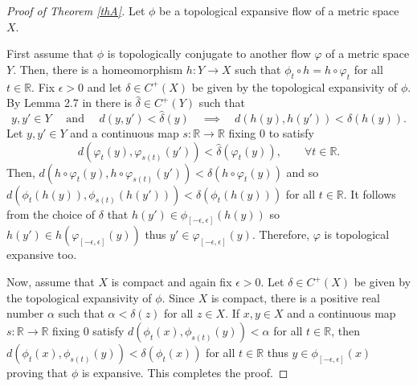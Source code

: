 \documentclass[11pt,letterpaper]{amsart}
\begin{document}
\begin{proof}[Proof of Theorem \ref{thA}]
Let $\phi$ be a topological expansive flow of a metric space $X$.

First assume that $\phi$ is topologically conjugate to another flow $\varphi$ of a metric space $Y$. Then,
there is a homeomorphism $h:Y\to X$ such that
$\phi_t\circ h=h\circ \varphi_t$ for all $t\in\mathbb{R}$.
Fix $\epsilon>0$ and let $\delta\in C^+(X)$ be given by the topological expansivity of $\phi$.
By Lemma 2.7 in \cite{lny} there is $\hat{\delta}\in C^+(Y)$ such that
$$
y,y'\in Y\quad\mbox{ and }\quad d(y,y')<\hat{\delta}(y)\quad\implies\quad d(h(y),h(y'))<\delta(h(y)).
$$
Let $y,y'\in Y$ and a continuous map $s:\mathbb{R}\to\mathbb{R}$ fixing $0$ to satisfy
$$
d(\varphi_t(y),\varphi_{s(t)}(y'))<\hat{\delta}(\varphi_t(y)),\qquad \forall t\in\mathbb{R}.
$$
Then, $d(h\circ \varphi_t(y),h\circ\varphi_{s(t)}(y'))<\delta(h\circ\varphi_t(y))$
and so $d(\phi_t(h(y)),\phi_{s(t)}(h(y')))<\delta(\phi_t(h(y)))$ for all $t\in\mathbb{R}$.
It follows from the choice of $\delta$ that
$h(y')\in \phi_{[-\epsilon,\epsilon]}(h(y))$ so
$h(y')\in h(\varphi_{[-\epsilon,\epsilon]}(y))$ thus
$y'\in\varphi_{[-\epsilon,\epsilon]}(y)$. Therefore, $\varphi$ is topological expansive too.

Now, assume that $X$ is compact and again fix $\epsilon>0$.
Let $\delta\in C^+(X)$ be given by the topological expansivity of $\phi$.
Since $X$ is compact, there is a positive real number $\alpha$ such that
$\alpha<\delta(z)$ for all $z\in X$.
If $x,y\in X$ and a continuous map $s:\mathbb{R}\to\mathbb{R}$ fixing $0$ satisfy
$d(\phi_t(x),\phi_{s(t)}(y))<\alpha$ for all $t\in\mathbb{R}$,
then $d(\phi_t(x),\phi_{s(t)}(y))<\delta(\phi_t(x))$ for all $t\in\mathbb{R}$
thus $y\in \phi_{[-\epsilon,\epsilon]}(x)$ proving that $\phi$ is expansive.
This completes the proof.
\end{proof}
\end{document}
